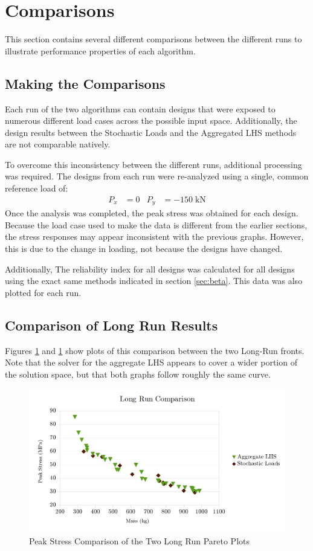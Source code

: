 \section{Comparisons}
This section contains several different comparisons between the different runs to illustrate performance properties of each algorithm. 

\subsection{Making the Comparisons}
Each run of the two algorithms can contain designs that were exposed to numerous different load cases across the possible input space. Additionally, the design results between the Stochastic Loads and the Aggregated LHS methods are not comparable natively. 

To overcome this inconsistency between the different runs, additional processing was required. The designs from each run were re-analyzed using a single, common reference load of: 
\begin{align*}
P_x &=0 &P_y &= -150 \; \text{kN}
\end{align*}
Once the analysis was completed, the peak stress was obtained for each design. Because the load case used to make the data is different from the earlier sections, the stress responses may appear inconsistent with the previous graphs. However, this is due to the change in loading, not because the designs have changed. 

Additionally, The reliability index for all designs was calculated for all designs using the exact same methods indicated in section \ref{sec:beta}. This data was also plotted for each run. 

\subsection{Comparison of Long Run Results}
Figures \ref{fig:pfront_comp_long} and \ref{fig:pfront_comp_long} show plots of this comparison between the two Long-Run fronts. Note that the solver for the aggregate LHS appears to cover a wider portion of the solution space, but that both graphs follow roughly the same curve. 

\begin{figure}[!htbp]
\includegraphics[width=\textwidth]{img/pf_comp_long.png}
\caption{Peak Stress Comparison of the Two Long Run Pareto Plots}
\label{fig:pfront_comp_long}
\end{figure}

